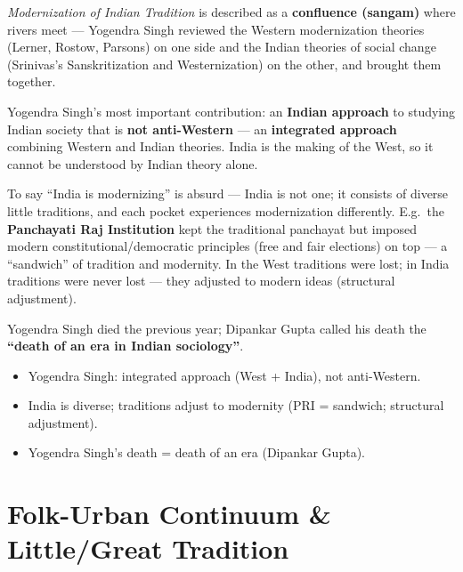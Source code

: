 \emph{Modernization of Indian Tradition} is described as a \textbf{confluence (sangam)} where rivers meet --- Yogendra Singh reviewed the Western modernization theories (Lerner, Rostow, Parsons) on one side and the Indian theories of social change (Srinivas's Sanskritization and Westernization) on the other, and brought them together.

\begin{KeyConcept}
Yogendra Singh's most important contribution: an \textbf{Indian approach} to studying Indian society that is \textbf{not anti-Western} --- an \textbf{integrated approach} combining Western and Indian theories. India is the making of the West, so it cannot be understood by Indian theory alone.
\end{KeyConcept}

\begin{ExampleBox}
To say ``India is modernizing'' is absurd --- India is not one; it consists of diverse little traditions, and each pocket experiences modernization differently. E.g.\ the \textbf{Panchayati Raj Institution} kept the traditional panchayat but imposed modern constitutional/democratic principles (free and fair elections) on top --- a ``sandwich'' of tradition and modernity. In the West traditions were lost; in India traditions were never lost --- they adjusted to modern ideas (structural adjustment).
\end{ExampleBox}

\begin{DataFact}
Yogendra Singh died the previous year; Dipankar Gupta called his death the \textbf{``death of an era in Indian sociology''}.
\end{DataFact}

\begin{QuickRevision}
\begin{itemize}
\item Yogendra Singh: integrated approach (West + India), not anti-Western.
\item India is diverse; traditions adjust to modernity (PRI = sandwich; structural adjustment).
\item Yogendra Singh's death = death of an era (Dipankar Gupta).
\end{itemize}
\end{QuickRevision}

\section{Folk-Urban Continuum \& Little/Great Tradition}


